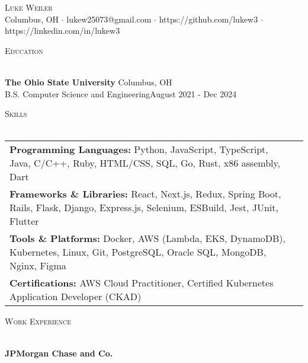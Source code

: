 \documentclass[letterpaper]{article}
\newcommand{\lineunder} {
    \vspace*{-8pt} \\
    \hspace*{-18pt} \hrulefill \\
}
\newcommand{\header} [1] {
    {\hspace*{-18pt}\vspace*{6pt} \textsc{#1}}
    \vspace*{-6pt} \lineunder
}
\begin{document}
\vspace*{-40pt}

\vspace*{-10pt}
\begin{center}
	{\Huge \scshape {Luke Weiler}}\\
	Columbus, OH $\cdot$ lukew25073@gmail.com $\cdot$ https://github.com/lukew3 $\cdot$ https://linkedin.com/in/lukew3\\
\end{center}

\header{Education}
\vspace{1mm}

    \textbf{The Ohio State University} \hfill Columbus, OH\\
    B.S. Computer Science and Engineering\hfill \hfill August 2021 - Dec 2024\\
    \vspace{2mm}


\header{Skills}
\vspace{1.5mm}
\hspace{-3mm}
\begin{tabular}{ l l }

    \textbf{Programming Languages:} Python, JavaScript, TypeScript, Java, C/C++, Ruby, HTML/CSS, SQL, Go, Rust, x86 assembly, Dart \\

    \textbf{Frameworks \& Libraries:} React, Next.js, Redux, Spring Boot, Rails, Flask, Django, Express.js, Selenium, ESBuild, Jest, JUnit, Flutter  \\

    \textbf{Tools \& Platforms:} Docker, AWS (Lambda, EKS, DynamoDB), Kubernetes, Linux, Git, PostgreSQL, Oracle SQL, MongoDB, Nginx, Figma  \\

    \textbf{Certifications:} AWS Cloud Practitioner, Certified Kubernetes Application Developer (CKAD)  \\

\end{tabular}
\vspace{2mm}

\header{Work Experience}
\vspace{1mm}

    \textbf{JPMorgan Chase and Co.}\\
\end{document}
